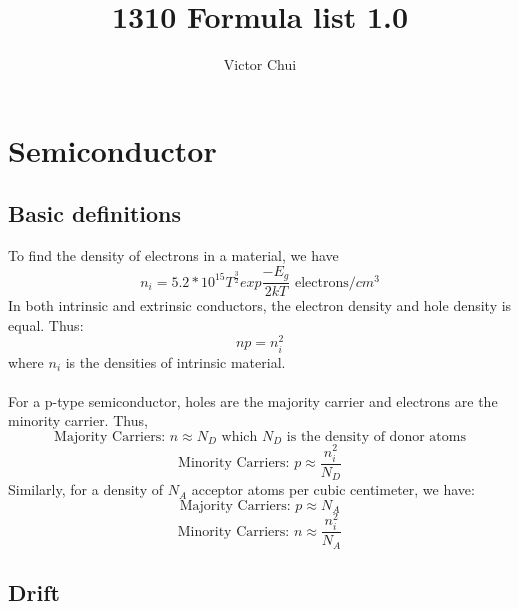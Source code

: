 \documentclass{article}
\title{1310 Formula list 1.0}
\author{Victor Chui}
\begin{document}
\maketitle
\tableofcontents
\pagebreak
\section{Semiconductor}
\subsection{Basic definitions}
To find the density of electrons in a material, we have
\begin{equation*}
	n_i = 5.2*10^{15}T^{\frac{3}{2}}exp\frac{-E_g}{2kT}\text{ electrons/}cm^3
\end{equation*}
In both intrinsic and extrinsic conductors, the electron density and hole density is equal. Thus:
\begin{equation*}
	np = n_i^2
\end{equation*}
where $n_i$ is the densities of intrinsic material.\\\\
For a p-type semiconductor, holes are the majority carrier and electrons are the minority carrier. Thus,
\begin{equation*}
	\text{Majority Carriers: } n \approx N_D \text{ which }N_D\text{ is the density of donor atoms}
\end{equation*}
\begin{equation*}
	\text{Minority Carriers: } p \approx \frac{n_i^2}{N_D}
\end{equation*}
Similarly, for a density of $N_A$ acceptor atoms per cubic centimeter, we have:
\begin{equation*}
	\text{Majority Carriers: } p \approx N_A 
\end{equation*}
\begin{equation*}
	\text{Minority Carriers: } n \approx \frac{n_i^2}{N_A}
\end{equation*}
\subsection{Drift}
\end{document}
